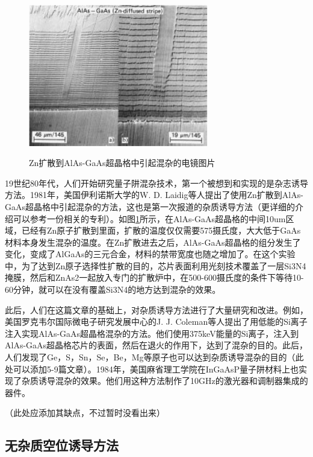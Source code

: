 \documentclass{ZJUthesis}
\begin{document}
\begin{figure}[!htb]
  \centering
  \includegraphics[width=0.7\textwidth]{./Pictures/iid.eps}\\
  \caption{Zn扩散到AlAs-GaAs超晶格中引起混杂的电镜图片}
  \label{fig_iid}
\end{figure}

19世纪80年代，人们开始研究量子阱混杂技术，第一个被想到和实现的是杂志诱导方法。1981年，美国伊利诺斯大学的W. D. Laidig等人提出了使用Zn扩散到AlAs-GaAs超晶格中引起混杂的方法\cite{laidig1981disorder}，这也是第一次报道的杂质诱导方法（更详细的介绍可以参考一份相关的专利\cite{holonyak1983method}）。如图\ref{fig_iid}所示，在AlAs-GaAs超晶格的中间10um区域，已经有Zn原子扩散到里面，扩散的温度仅仅需要575摄氏度，大大低于GaAs材料本身发生混杂的温度。在Zn扩散进去之后，AlAs-GaAs超晶格的组分发生了变化，变成了AlGaAs的三元合金，材料的禁带宽度也随之增加了。在这个实验中，为了达到Zn原子选择性扩散的目的，芯片表面利用光刻技术覆盖了一层Si3N4掩膜，然后和ZnAs2一起放入专门的扩散炉中，在500-600摄氏度的条件下等待10-60分钟，就可以在没有覆盖Si3N4的地方达到混杂的效果。

此后，人们在这篇文章的基础上，对杂质诱导方法进行了大量研究和改进。例如，美国罗克韦尔国际微电子研究发展中心的J. J. Coleman等人提出了用低能的Si离子注入实现AlAs-GaAs超晶格混杂的方法\cite{coleman1982disorder}。他们使用375keV能量的Si离子，注入到AlAs-GaAs超晶格芯片的表面，然后在退火的作用下，达到了混杂的目的。此后，人们发现了Ge，S，Sn，Se，Be，Mg等原子也可以达到杂质诱导混杂的目的（此处可以添加5-9篇文章）。1984年，美国麻省理工学院在InGaAsP量子阱材料上也实现了杂质诱导混杂的效果。他们用这种方法制作了10GHz的激光器和调制器集成的器件\cite{tsang1981intracavity}。

（此处应添加其缺点，不过暂时没看出来）

\subsection{无杂质空位诱导方法}
\end{document}
